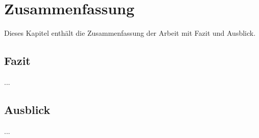 \chapter{Zusammenfassung}



Dieses Kapitel enthält die Zusammenfassung der Arbeit mit Fazit und Ausblick.

\section{Fazit}

...

\section{Ausblick}

...

